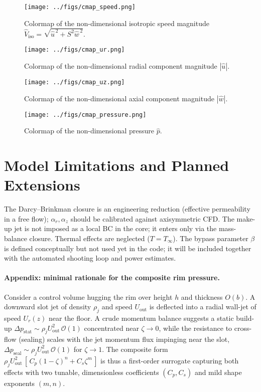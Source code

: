 \documentclass[11pt,a4paper]{article}
\begin{document}
\begin{figure}[H]
  \centering
  \texttt{[image: ../figs/cmap\_speed.png]}
  \caption{Colormap of the non-dimensional isotropic speed magnitude $\hat V_{\mathrm{iso}}=\sqrt{\hat u^{\,2}+S^{2}\hat w^{\,2}}$.}
  \label{fig:cmap_speed}
\end{figure}

\begin{figure}[H]
  \centering
  \texttt{[image: ../figs/cmap\_ur.png]}
  \caption{Colormap of the non-dimensional radial component magnitude $|\hat u|$.}
  \label{fig:cmap_ur}
\end{figure}

\begin{figure}[H]
  \centering
  \texttt{[image: ../figs/cmap\_uz.png]}
  \caption{Colormap of the non-dimensional axial component magnitude $|\hat w|$.}
  \label{fig:cmap_uz}
\end{figure}

\begin{figure}[H]
  \centering
  \texttt{[image: ../figs/cmap\_pressure.png]}
  \caption{Colormap of the non-dimensional pressure $\hat p$.}
  \label{fig:cmap_p}
\end{figure}

\section{Model Limitations and Planned Extensions}
The Darcy--Brinkman closure is an engineering reduction (effective permeability in a
free flow); $\alpha_r,\alpha_z$ should be calibrated against axisymmetric CFD.
The make-up jet is not imposed as a local BC in the core; it enters only via the
mass-balance closure. Thermal effects are neglected ($T=T_\infty$). The bypass parameter
$\beta$ is defined conceptually but not used yet in the code; it will be included together
with the automated shooting loop and power estimates.

\paragraph{Appendix: minimal rationale for the composite rim pressure.}
Consider a control volume hugging the rim over height $h$ and thickness $O(b)$.
A downward slot jet of density $\rho_j$ and speed $U_{\mathrm{out}}$ is deflected
into a radial wall-jet of speed $U_r(z)$ near the floor. A crude momentum balance
suggests a static build-up $\Delta p_{\mathrm{stat}}\sim \rho_j U_{\mathrm{out}}^2
\,\mathcal{O}(1)$ concentrated near $\zeta\!\to\!0$, while the resistance to
cross-flow (sealing) scales with the jet momentum flux impinging near the slot,
$\Delta p_{\mathrm{seal}}\sim \rho_j U_{\mathrm{out}}^2\,\mathcal{O}(1)$ for
$\zeta\!\to\!1$. The composite form
$\rho_j U_{\mathrm{out}}^2\,[\,C_p(1-\zeta)^n + C_s \zeta^m\,]$ is thus a
first-order surrogate capturing both effects with two tunable, dimensionless
coefficients $(C_p,C_s)$ and mild shape exponents $(m,n)$.
\end{document}
